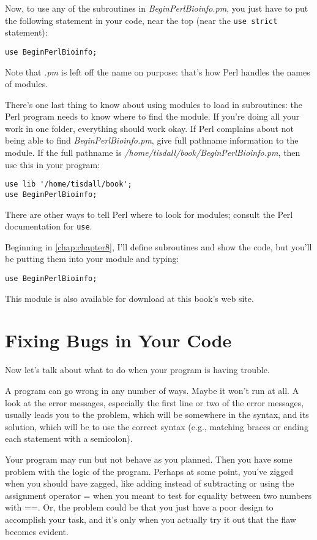 Now, to use any of the subroutines in \textit{BeginPerlBioinfo.pm}, you just have to put the following statement in your code, near the top (near the \verb|use strict| statement): 

\begin{lstlisting}
use BeginPerlBioinfo;
\end{lstlisting}

Note that \textit{.pm} is left off the name on purpose: that's how Perl handles the names of modules.

There's one last thing to know about using modules to load in subroutines: the Perl program needs to know where to find the module. If you're doing all your work in one folder, everything should work okay.  If Perl complains about not being able to find \textit{BeginPerlBioinfo.pm}, give full pathname information to the module. If the full pathname is \textit{/home/tisdall/book/BeginPerlBioinfo.pm}, then use this in your program:

\begin{lstlisting}
use lib '/home/tisdall/book';
use BeginPerlBioinfo;
\end{lstlisting}

There are other ways to tell Perl where to look for modules; consult the Perl documentation for \verb|use|.

Beginning in \autoref{chap:chapter8}, I'll define subroutines and show the code, but you'll be putting them into your module and typing:

\begin{lstlisting}
use BeginPerlBioinfo;
\end{lstlisting}

This module is also available for download at this book's web site. 

\section{Fixing Bugs in Your Code}
Now let's talk about what to do when your program is having trouble.

A program can go wrong in any number of ways. Maybe it won't run at all. A look at the error messages, especially the first line or two of the error messages, usually leads you to the problem, which will be somewhere in the syntax, and its solution, which will be to use the correct syntax (e.g., matching braces or ending each statement with a semicolon).

Your program may run but not behave as you planned. Then you have some problem with the logic of the program. Perhaps at some point, you've zigged when you should have zagged, like adding instead of subtracting or using the assignment operator = when you meant to test for equality between two numbers with ==. Or, the problem could be that you just have a poor design to accomplish your task, and it's only when you actually try it out that the flaw becomes evident.

